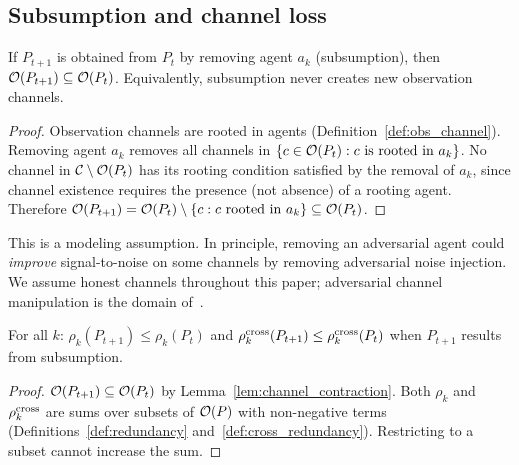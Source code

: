 \subsection{Subsumption and channel loss}

\begin{lemma}
\label{lem:channel_contraction}
If $P_{t+1}$ is obtained from $P_t$ by removing agent $a_k$
(subsumption), then $\mathcal{O}(P_{t+1}) \subseteq \mathcal{O}(P_t)$.
Equivalently, subsumption never creates new observation channels.
\end{lemma}

\begin{proof}
Observation channels are rooted in agents (Definition~\ref{def:obs_channel}).
Removing agent $a_k$ removes all channels in $\{c \in \mathcal{O}(P_t) :
c \text{ is rooted in } a_k\}$.  No channel in $\mathcal{C} \setminus \mathcal{O}(P_t)$
has its rooting condition satisfied by the removal of $a_k$, since
channel existence requires the presence (not absence) of a rooting
agent.  Therefore $\mathcal{O}(P_{t+1}) = \mathcal{O}(P_t) \setminus
\{c : c \text{ rooted in } a_k\} \subseteq \mathcal{O}(P_t)$.
\end{proof}

\begin{remark}
This is a modeling assumption.  In principle, removing an adversarial
agent could \emph{improve} signal-to-noise on some channels by
removing adversarial noise injection.  We assume honest channels
throughout this paper; adversarial channel manipulation is
the domain of~\citet{lasser2026exo}.
\end{remark}

\begin{corollary}
\label{cor:redundancy_monotone}
For all $k$: $\rho_k(P_{t+1}) \leq \rho_k(P_t)$ and
$\rho^{\mathrm{cross}}_k(P_{t+1}) \leq \rho^{\mathrm{cross}}_k(P_t)$ when $P_{t+1}$ results
from subsumption.
\end{corollary}

\begin{proof}
$\mathcal{O}(P_{t+1}) \subseteq \mathcal{O}(P_t)$ by
Lemma~\ref{lem:channel_contraction}.  Both $\rho_k$ and $\rho^{\mathrm{cross}}_k$
are sums over subsets of $\mathcal{O}(P)$ with non-negative terms
(Definitions~\ref{def:redundancy} and~\ref{def:cross_redundancy}).
Restricting to a subset cannot increase the sum.
\end{proof}
